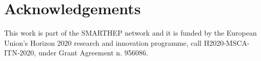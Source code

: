 \documentclass{smarthepnote}
\begin{document}









\clearpage
\section*{Acknowledgements}
This work is part of the SMARTHEP network and it is funded by the European Union’s Horizon 2020 research and innovation programme, call H2020-MSCA-ITN-2020, under Grant Agreement n. 956086. 




%
\end{document}
